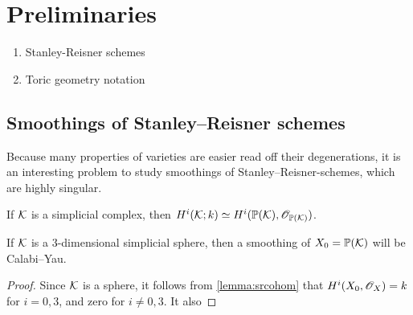 \chapter{Preliminaries}
\label{sec:prelims}

\begin{enumerate}
	\item Stanley-Reisner schemes
	\item Toric geometry notation
\end{enumerate}

\section{Smoothings of Stanley--Reisner schemes}

Because many properties of varieties are easier read off their degenerations, it is an interesting problem to study smoothings of Stanley--Reisner-schemes, which are highly singular.

\begin{lemma}
\label{lemma:srcohom}
If $\mathcal{K}$ is a simplicial complex, then $H^i(\mathcal{K};k) \simeq H^i(\mathbb{P}(\mathcal{K}),\mathscr{O}_{\mathbb{P}(\mathcal{K})})$.
\end{lemma}

\begin{lemma}
If $\mathcal{K}$ is a 3-dimensional simplicial sphere, then a smoothing of $X_0=\mathbb{P}(\mathcal{K})$ will be Calabi--Yau.
\end{lemma}
\begin{proof}
Since $\mathcal{K}$ is a sphere, it follows from \ref{lemma:srcohom} that $H^i(X_0,\mathscr{O}_X)=k$ for $i=0,3$, and zero for $i \neq 0,3$. It also 
\end{proof}